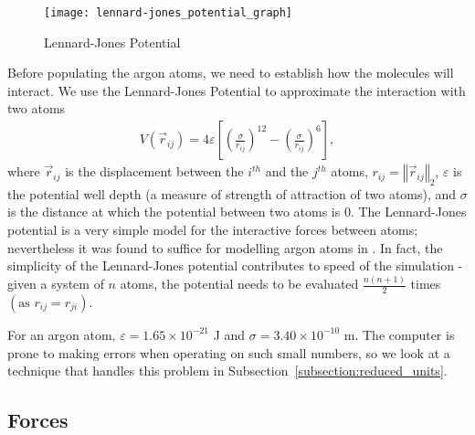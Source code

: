 \documentclass[../Main.tex]{subfiles}
\begin{document}
\begin{wrapfigure}[16]{r}{0.5\textwidth}
\centering
\texttt{[image: lennard-jones\_potential\_graph]}
\caption{Lennard-Jones Potential}
\label{fig:lennard-jones_potential}
\end{wrapfigure}

Before populating the argon atoms, we need to establish how the molecules will interact. We use the Lennard-Jones Potential to approximate the interaction with two atoms
\begin{align}
	V\left(\vec{r}_{ij}\right) = 4\varepsilon \left[ \left( \frac{\sigma}{r_{ij}}\right)^{12} - \left( \frac{\sigma}{r_{ij}}\right)^{6} \right], \label{eqn:lennard-jones_potential}
\end{align}
where $\vec{r}_{ij}$ is the displacement between the $i^{th}$ and the $j^{th}$ atoms, $r_{ij} = \left\Vert\vec{r}_{ij}\right\Vert_{2}$, $\varepsilon$ is the potential well depth (a measure of strength of attraction of two atoms), and $\sigma$ is the distance at which the potential between two atoms is 0. The Lennard-Jones potential is a very simple model for the interactive forces between atoms; nevertheless it was found to suffice for modelling argon atoms in \cite{Rahman1964}. In fact, the simplicity of the Lennard-Jones potential contributes to speed of the simulation - given a system of $n$ atoms, the potential needs to be evaluated $\frac{n\left(n+1\right)}{2}$ times $\left(\mbox{as }r_{ij} = r_{ji}\right)$.

For an argon atom, $\varepsilon = 1.65 \times 10^{-21}$ J and $\sigma = 3.40 \times 10^{-10}$ m. The computer is prone to making errors when operating on such small numbers, so we look at a technique that handles this problem in Subsection~\ref{subsection:reduced_units}.

\subsection{Forces}
\end{document}
